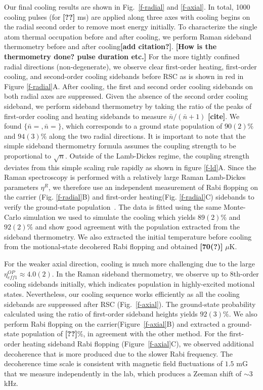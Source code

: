 \documentclass[aps,prl,twocolumn,groupedaddress]{revtex4-1}
\newcommand{\fxnote}[1]{{\textbf{[#1]}}}
\begin{document}
Our final cooling results are shown in Fig.~\ref{f-radial} and \ref{f-axial}.
In total, 1000 cooling pulses (for \fxnote{??} ms) are applied along three axes with
cooling begins on the radial second order to remove most energy initially.
To characterize the single atom thermal occupation before and after cooling,
we perform Raman sideband thermometry before and after cooling\fxnote{add citation?}.
\fxnote{How is the thermometry done? pulse duration etc.}
For the more tightly confined radial directions (non-degenerate),
we observe clear first-order heating, first-order cooling,
and second-order cooling sidebands before RSC as is shown in red in Figure \ref{f-radial}A.
After cooling, the first and second order cooling sidebands on both radial axes are suppressed.
Given the absence of the second order cooling sideband, we perform sideband thermometry
by taking the ratio of the peaks of first-order cooling and heating sidebands to measure $\bar n / (\bar n + 1)$ \fxnote{cite}.
We found $\{\bar n =,\bar n =\}$, which corresponds to a ground state population of $90(2)\%$
and $94(3)\%$ along the two radial directions.
It is important to note that the simple sideband thermometry formula assumes the coupling strength
to be proportional to $\sqrt{n}$. Outside of the Lamb-Dickes regime,
the coupling strength deviates from this simple scaling rule rapidly
as shown in figure \ref{f-ld}A. Since the Raman spectroscopy is performed
with a relatively large Raman Lamb-Dickes parameters $\eta^R$,
we therefore use an independent measurement of Rabi flopping on the carrier (Fig. \ref{f-radial}B)
and first-order heating(Fig. \ref{f-radial}C) sidebands
to verify the ground-state population~\cite{Meekhof1996}.
The data is fitted using the same Monte-Carlo simulation we used to simulate the cooling
which yields $89(2)\%$ and $92(2)\%$ and show good agreement with
the population extracted from the sideband thermometry.
We also extracted the initial temperature before cooling
from the motional-state decohered Rabi flopping and obtained \fxnote{70(?)} $\mu$K.

For the weaker axial direction, cooling is much more challenging
due to the large $\eta^{OP}_{eff1}\approx 4.0(2)$.
In the Raman sideband thermometry, we observe up to 8th-order cooling sidebands initially,
which indicates population in highly-excited motional states.
Nevertheless, our cooling sequence works efficiently as all the cooling sidebands are suppressed
after RSC (Fig.~\ref{f-axial}).
The ground-state probability calculated using the ratio of first-order sideband heights yields
$92(3)\%$. We also perform Rabi flopping on the carrier(Figure~\ref{f-axial}B)
and extracted a ground-state population of \fxnote{??}\%, in agreement with the other method.
For the first-order heating sideband Rabi flopping (Figure~\ref{f-axial}C),
we observed additional decoherence that is more produced due to the slower Rabi frequency.
The decoherence time scale is consistent with magnetic field fluctuations of $1.5$ mG
that we measure independently in the lab, which produces a Zeeman shift of $\sim 3$ kHz.
\end{document}
